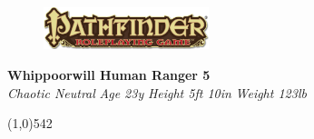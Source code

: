 \documentclass[letterpaper]{article}
\newcommand{\fullline}{\noindent\line(1,0){542} \\}
\begin{document}
\sffamily
\begin{figure}
\vspace{-1.5em}
\includegraphics[width=13em]{Pathfinder}
\end{figure}
\noindent \textbf{\huge{Whippoorwill }\Large{Human Ranger 5}} \\
\emph{Chaotic Neutral} \hspace{2em} \emph{Age 23y} \hspace{2em} \emph{Height 5ft 10in} \hspace{2em} \emph{Weight 123lb} \par
\vspace{-0.75em}

\fullline
\end{document}
